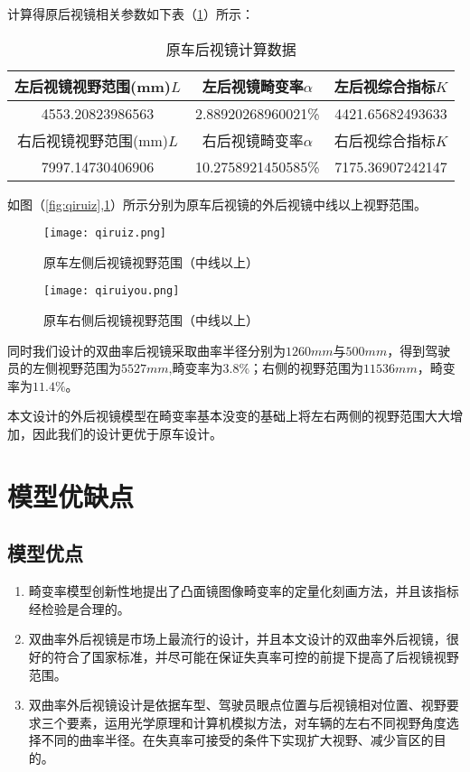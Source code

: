 \documentclass[withoutpreface,bwprint]{cumcmthesis} %
\begin{document}
计算得原后视镜相关参数如下表（\ref{原车后视镜计算数据}）所示：
\begin{table}[!htbp]
\centering
\caption{原车后视镜计算数据}
\label{原车后视镜计算数据}
\begin{tabular}{|c|c|c|}
\toprule
左后视镜视野范围(mm)$L$ & 左后视镜畸变率$\alpha$ & 左后视综合指标$K$ \\ \hline 
4553.20823986563 & 2.88920268960021\%  & 4421.65682493633 \\ \hline 


右后视镜视野范围(mm)$L$ & 右后视镜畸变率$\alpha$  & 右后视综合指标$K$ \\ \hline
7997.14730406906 & 10.2758921450585\%  &  7175.36907242147 \\

\bottomrule 
\end{tabular}

\end{table}
\par 如图（\ref{fig:qiruiz},\ref{fig:qiruiy}）所示分别为原车后视镜的外后视镜中线以上视野范围。


\begin{figure}[!htbp]  
\begin{minipage}[t]{0.5\textwidth}
\centering  
\texttt{[image: qiruiz.png]}
\caption{原车左侧后视镜视野范围（中线以上）} \label{fig:qiruiz}\end{minipage}
\hspace{1ex}
\begin{minipage}[t]{0.5\textwidth}  
\centering  
\texttt{[image: qiruiyou.png]}
\caption{原车右侧后视镜视野范围（中线以上）} \label{fig:qiruiy}
\end{minipage}  
\end{figure} 

 
\par 同时我们设计的双曲率后视镜采取曲率半径分别为$1260mm$与$500mm$，得到驾驶员的左侧视野范围为$5527mm$,畸变率为$3.8\%$；右侧的视野范围为$11536 mm$，畸变率为$11.4\%$。

\par 本文设计的外后视镜模型在畸变率基本没变的基础上将左右两侧的视野范围大大增加，因此我们的设计更优于原车设计。


\section{模型优缺点}
\subsection{模型优点}
\begin{enumerate}
	\item 畸变率模型创新性地提出了凸面镜图像畸变率的定量化刻画方法，并且该指标经检验是合理的。
	\item 双曲率外后视镜是市场上最流行的设计，并且本文设计的双曲率外后视镜，很好的符合了国家标准，并尽可能在保证失真率可控的前提下提高了后视镜视野范围。
	\item 双曲率外后视镜设计是依据车型、驾驶员眼点位置与后视镜相对位置、视野要求三个要素，运用光学原理和计算机模拟方法，对车辆的左右不同视野角度选择不同的曲率半径。在失真率可接受的条件下实现扩大视野、减少盲区的目的。
\end{enumerate}
\end{document}
